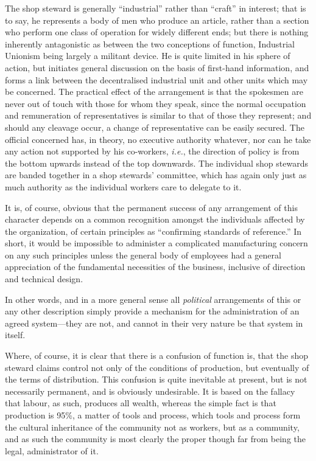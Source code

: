 \documentclass{book}
\begin{document}
The shop steward is generally “industrial” rather than “craft” in interest; that is to say, he represents a body of men who produce an article, rather than a section who perform one class of operation for widely different ends; but there is nothing inherently antagonistic as between the two conceptions of function, Industrial Unionism being largely a militant device. He is quite limited in his sphere of action, but initiates general discussion on the basis of first-hand information, and forms a link between the decentralised industrial unit and other units which may be concerned. The practical effect of the arrangement is that the spokesmen are never out of touch with those for whom they speak, since the normal occupation and remuneration of representatives is similar to that of those they represent; and should any cleavage occur, a change of representative can be easily secured. The official concerned has, in theory, no executive authority whatever, nor can he take any action not supported by his co-workers, \emph{i.e.}, the direction of policy is from the bottom upwards instead of the top downwards. The individual shop stewards are banded together in a shop stewards’ committee, which has again only just as much authority as the individual workers care to delegate to it.

It is, of course, obvious that the permanent success of any arrangement of this character depends on a common recognition amongst the individuals affected by the organization, of certain principles as “confirming standards of reference.” In short, it would be impossible to administer a complicated manufacturing concern on any such principles unless the general body of employees had a general appreciation of the fundamental necessities of the business, inclusive of direction and technical design.

In other words, and in a more general sense all \emph{political} arrangements of this or any other description simply provide a mechanism for the administration of an agreed system—they are not, and cannot in their very nature be that system in itself.

Where, of course, it is clear that there is a confusion of function is, that the shop steward claims control not only of the conditions of production, but eventually of the terms of distribution. This confusion is quite inevitable at present, but is not necessarily permanent, and is obviously undesirable. It is based on the fallacy that labour, as such, produces all wealth, whereas the simple fact is that production is 95\%, a matter of tools and process, which tools and process form the cultural inheritance of the community not as workers, but as a community, and as such the community is most clearly the proper though far from being the legal, administrator of it.
\end{document}
